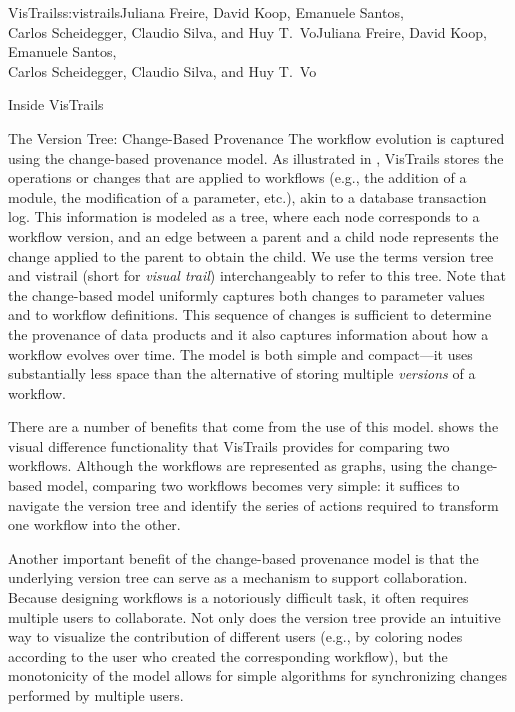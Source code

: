 \begin{aosachaptertoc}{VisTrails}{s:vistrails}{Juliana Freire, David Koop, Emanuele Santos, \\ Carlos Scheidegger, Claudio Silva, and Huy T.\ Vo}{Juliana Freire, David Koop, Emanuele Santos, \\ \hspace*{0.9cm} Carlos Scheidegger, Claudio Silva, and Huy T.\ Vo}
\begin{aosasect1}{Inside VisTrails}
\begin{aosasect2}{The Version Tree: Change-Based Provenance}
The workflow evolution is captured using the change-based provenance
model.  As illustrated in ,
VisTrails stores the operations or changes that are applied to
workflows (e.g., the addition of a module, the modification of a
parameter, etc.), akin to a database transaction log.  This
information is modeled as a tree, where each node corresponds to a
workflow version, and an edge between a parent and a child node
represents the change applied to the parent to obtain the child. We
use the terms version tree and vistrail (short for \emph{visual
trail}) interchangeably to refer to this tree.  Note that the
change-based model uniformly captures both changes to parameter values
and to workflow definitions. This sequence of changes is sufficient to
determine the provenance of data products and it also captures
information about how a workflow evolves over time.  The model is both
simple and compact---it uses substantially less space than the
alternative of storing multiple \emph{versions} of a workflow.

There are a number of benefits that come from the use of this model.
 shows the visual difference
functionality that VisTrails provides for comparing two
workflows. Although the workflows are represented as graphs, using the
change-based model, comparing two workflows becomes very simple: it
suffices to navigate the version tree and identify the series of
actions required to transform one workflow into the other.

Another important benefit of the change-based provenance model is that
the underlying version tree can serve as a mechanism to support
collaboration. Because designing workflows is a notoriously difficult
task, it often requires multiple users to collaborate.  Not only does
the version tree provide an intuitive way to visualize the
contribution of different users (e.g., by coloring nodes according to
the user who created the corresponding workflow), but the monotonicity
of the model allows for simple algorithms for synchronizing changes
performed by multiple users.


\end{aosasect2}
\end{aosasect1}
\end{aosachaptertoc}
